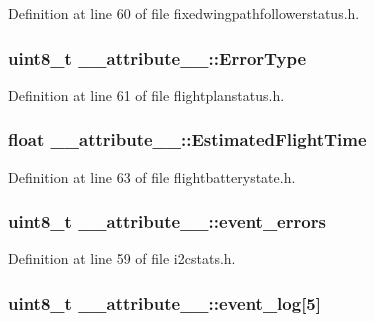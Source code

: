 \-Definition at line 60 of file fixedwingpathfollowerstatus.\-h.

\hypertarget{struct____attribute_____ac3f37a8d7761a72ba40237aed33888c8}{
\subsubsection[{\-Error\-Type}]{\setlength{\rightskip}{0pt plus 5cm}uint8\-\_\-t {\bf \-\_\-\-\_\-attribute\-\_\-\-\_\-\-::\-Error\-Type}}}\label{struct____attribute_____ac3f37a8d7761a72ba40237aed33888c8}


\-Definition at line 61 of file flightplanstatus.\-h.

\hypertarget{struct____attribute_____aaa2fa904c29361ed509995c903914344}{
\subsubsection[{\-Estimated\-Flight\-Time}]{\setlength{\rightskip}{0pt plus 5cm}float {\bf \-\_\-\-\_\-attribute\-\_\-\-\_\-\-::\-Estimated\-Flight\-Time}}}\label{struct____attribute_____aaa2fa904c29361ed509995c903914344}


\-Definition at line 63 of file flightbatterystate.\-h.

\hypertarget{struct____attribute_____a9d500731e164fbe1281f2e21ecac4e58}{
\subsubsection[{event\-\_\-errors}]{\setlength{\rightskip}{0pt plus 5cm}uint8\-\_\-t {\bf \-\_\-\-\_\-attribute\-\_\-\-\_\-\-::event\-\_\-errors}}}\label{struct____attribute_____a9d500731e164fbe1281f2e21ecac4e58}


\-Definition at line 59 of file i2cstats.\-h.

\hypertarget{struct____attribute_____aecc83d112889a512cfc70fe4693cf168}{
\subsubsection[{event\-\_\-log}]{\setlength{\rightskip}{0pt plus 5cm}uint8\-\_\-t {\bf \-\_\-\-\_\-attribute\-\_\-\-\_\-\-::event\-\_\-log}\mbox{[}5\mbox{]}}}\label{struct____attribute_____aecc83d112889a512cfc70fe4693cf168}


